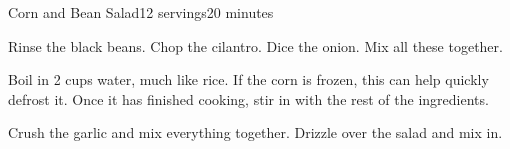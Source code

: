 \documentclass[../Cookbook.tex]{subfiles}
\begin{document}
\begin{recipe}[CornSalad]{Corn and Bean Salad}{12 servings}{20 minutes}

	Rinse the black beans. Chop the cilantro. Dice the onion. Mix all these together.

	Boil in 2 cups water, much like rice. If the corn is frozen, this can help quickly defrost it. Once it has finished cooking, stir in with the rest of the ingredients.

	Crush the garlic and mix everything together. Drizzle over the salad and mix in.

\end{recipe}
\end{document}

